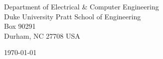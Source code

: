 \begin{minipage}{0.49\textwidth}
    \begin{flushleft}
    \noindent
    Department of Electrical \& Computer Engineering\\
    Duke University Pratt School of Engineering\\
    Box 90291\\
    Durham, NC 27708 USA
    \end{flushleft}
    \end{minipage}
    \begin{minipage}{0.47\textwidth}
    \begin{flushright}
    \today
    \end{flushright}
    \end{minipage} \\
    
    \newcommand{\univ}{Duke University}
    \newcommand{\univshort}{Duke}
    \newcommand{\degree}{Ph.D.}
    \newcommand{\dept}{Electrical and Computer Engineering}
